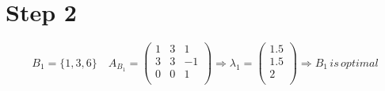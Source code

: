 \documentclass[a4paper,11pt,french]{article}
\begin{document}
     \section{Step 2}
  \begin{displaymath}
  B_1=\{1,3,6\}\quad A_{B_1}=\left(
\begin{array}{ccc}
1 & 3 & 1\\
3 & 3 & -1 \\
0 & 0 & 1\\
\end{array}
\right) \Rightarrow \lambda_1=\left(\begin{array}{c} 1.5\\ 1.5\\ 2\\ \end{array}\right)\Rightarrow B_1\,is\,optimal
   \end{displaymath}
    
    
\end{document}
